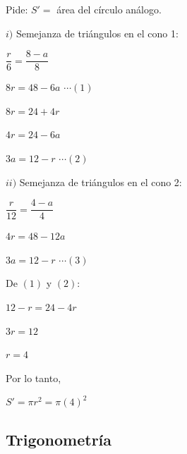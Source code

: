 \begin{enumerate}
	Pide: $S'=$ área del círculo análogo.
	
	$i)$ Semejanza de triángulos en el cono 1:
	
	$\dfrac{r}{6}=\dfrac{8-a}{8}$
	
	$8r=48-6a$ \quad $\cdots (1)$
	
	$8r=24+4r$
	
	$4r=24-6a$
	
	$3a=12-r$ \quad $\cdots (2)$
	
	$ii)$ Semejanza de triángulos en el cono 2:
	
	$\dfrac{r}{12}=\dfrac{4-a}{4}$
	
	$4r=48-12a$
	
	$3a=12-r$ \quad $\cdots (3)$
	
	De $(1)$ y $(2)$:
	
	$12-r=24-4r$
	
	$3r=12$
	
	$r=4$
	
	Por lo tanto,
	
	$S'=\pi r^2=\pi(4)^2$
	
	
	\vspace{6mm}
	
\end{enumerate}





\subsection*{Trigonometría}

